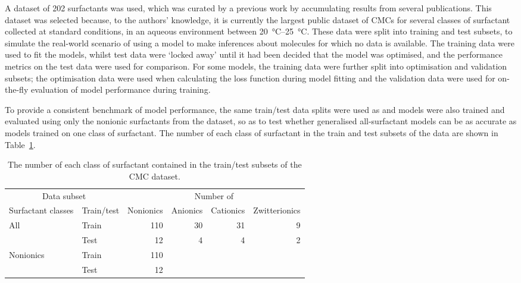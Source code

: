 A dataset of 202 surfactants was used, which was curated by a previous work
\cite{qinPredictingCriticalMicelle2021a} by accumulating results from several
publications. This dataset was selected because, to the authors' knowledge, it
is currently the largest public dataset of CMCs for several classes of
surfactant collected at standard conditions, in an aqueous environment between
\SIrange{20}{25}{\celsius}. These data were split into training and test
subsets, to simulate the real-world scenario of using a model to make inferences
about molecules for which no data is available. The training data were used to
fit the models, whilst test data were `locked away' until it had been decided
that the model was optimised, and the performance metrics on the test data were
used for comparison. For some models, the training data were further split into
optimisation and validation subsets; the optimisation data were used when
calculating the loss function during model fitting and the validation data were
used for on-the-fly evaluation of model performance during training.

To provide a consistent benchmark of model performance, the same train/test data
splits were used as \citet{qinPredictingCriticalMicelle2021a} and models were
also trained and evaluated using only the nonionic surfactants from the dataset,
so as to test whether generalised all-surfactant models can be as accurate as
models trained on one class of surfactant. The number of each class of
surfactant in the train and test subsets of the data are shown in
Table~\ref{tab:data-split}.

\begin{table}
    \centering
    \caption{The number of each class of surfactant contained in the train/test subsets of the CMC dataset.}
    \label{tab:data-split}
    \begin{tabular}{@{}llrrrr@{}} \toprule \multicolumn{2}{c}{Data subset} & \multicolumn{4}{c}{Number of}                                                    \\
               \cmidrule(r){1-2}\cmidrule(l){3-6}  Surfactant classes  & Train/test                    & Nonionics & Anionics & Cationics & Zwitterionics \\
               \midrule All                                            & Train                         & 110       & 30       & 31        & 9             \\
                                                                       & Test                          & 12        & 4        & 4         & 2             \\
               Nonionics                                               & Train                         & 110        &          &           &               \\
                                                                       & Test                          & 12        &          &           &               \\\bottomrule
    \end{tabular}
\end{table}

